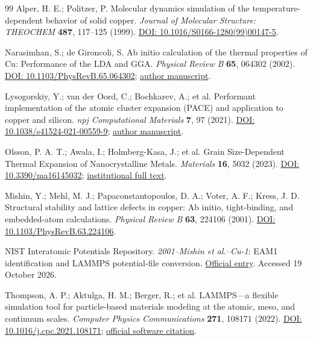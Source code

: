 \documentclass[10pt,a4paper,twocolumn]{article}
\begin{document}
\FloatBarrier
\begin{thebibliography}{99}
\fontsize{8.5}{10.2}\selectfont
{} Alper, H. E.; Politzer, P. Molecular dynamics simulation of the temperature-dependent behavior of solid copper. \emph{Journal of Molecular Structure: THEOCHEM} \textbf{487}, 117–125 (1999). \href{https://doi.org/10.1016/S0166-1280(99)00147-5}{DOI: 10.1016/S0166-1280(99)00147-5}.

 Narasimhan, S.; de Gironcoli, S. Ab initio calculation of the thermal properties of Cu: Performance of the LDA and GGA. \emph{Physical Review B} \textbf{65}, 064302 (2002). \href{https://doi.org/10.1103/PhysRevB.65.064302}{DOI: 10.1103/PhysRevB.65.064302}; \href{https://arxiv.org/abs/cond-mat/0109020}{author manuscript}.

 Lysogorskiy, Y.; van der Oord, C.; Bochkarev, A.; et al. Performant implementation of the atomic cluster expansion (PACE) and application to copper and silicon. \emph{npj Computational Materials} \textbf{7}, 97 (2021). \href{https://doi.org/10.1038/s41524-021-00559-9}{DOI: 10.1038/s41524-021-00559-9}; \href{https://arxiv.org/abs/2103.00814}{author manuscript}.

 Olsson, P. A. T.; Awala, I.; Holmberg-Kasa, J.; et al. Grain Size-Dependent Thermal Expansion of Nanocrystalline Metals. \emph{Materials} \textbf{16}, 5032 (2023). \href{https://doi.org/10.3390/ma16145032}{DOI: 10.3390/ma16145032}; \href{https://lucris.lub.lu.se/ws/portalfiles/portal/159582754/Olsson_2023c.pdf}{institutional full text}.

 Mishin, Y.; Mehl, M. J.; Papaconstantopoulos, D. A.; Voter, A. F.; Kress, J. D. Structural stability and lattice defects in copper: Ab initio, tight-binding, and embedded-atom calculations. \emph{Physical Review B} \textbf{63}, 224106 (2001). \href{https://doi.org/10.1103/PhysRevB.63.224106}{DOI: 10.1103/PhysRevB.63.224106}.

 NIST Interatomic Potentials Repository. \emph{2001–Mishin et al.–Cu-1}: EAM1 identification and LAMMPS potential-file conversion. \href{https://www.ctcms.nist.gov/potentials/entry/2001--Mishin-Y-Mehl-M-J-Papaconstantopoulos-D-A-et-al--Cu-1/}{Official entry}. Accessed 19 October 2026.

 Thompson, A. P.; Aktulga, H. M.; Berger, R.; et al. LAMMPS—a flexible simulation tool for particle-based materials modeling at the atomic, meso, and continuum scales. \emph{Computer Physics Communications} \textbf{271}, 108171 (2022). \href{https://doi.org/10.1016/j.cpc.2021.108171}{DOI: 10.1016/j.cpc.2021.108171}; \href{https://www.lammps.org/about/citing/}{official software citation}.


\end{thebibliography}
\end{document}

